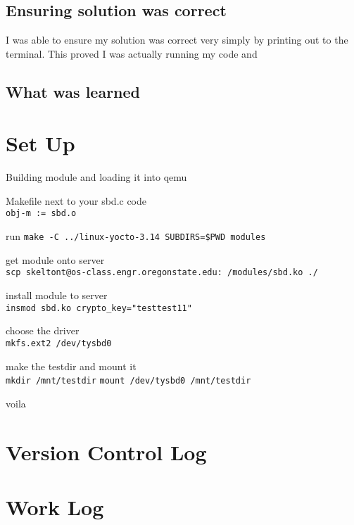 \documentclass[10pt,draftclsnofoot,onecolumn]{IEEEtran}
\begin{document}
\subsection{Ensuring solution was correct}
I was able to ensure my solution was correct very simply by printing out to the terminal.
This proved I was actually running my code and 


\subsection{What was learned}


\section{Set Up}
Building module and loading it into qemu
\begin{list}{-}{}
\item Makefile next to your sbd.c code \\
\texttt{obj-m := sbd.o}
\item run
\texttt{make -C ../linux-yocto-3.14 SUBDIRS=\$PWD modules}
\item get module onto server \\
\texttt{scp skeltont@os-class.engr.oregonstate.edu:~/modules/sbd.ko ./}
\item install module to server \\
\texttt{insmod sbd.ko crypto\_key="testtest11"}
\item choose the driver \\
\texttt{mkfs.ext2 /dev/tysbd0}
\item make the testdir and mount it \\
\texttt{mkdir /mnt/testdir}
\texttt{mount /dev/tysbd0 /mnt/testdir}
\item voila
\end{list}

\section{Version Control Log}


\section{Work Log}

\end{document}
